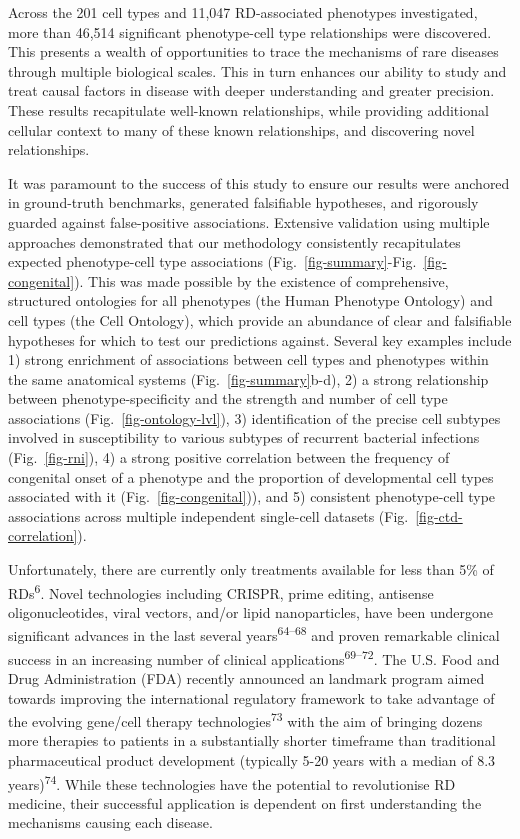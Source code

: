 \documentclass[
]{article}
\begin{document}
Across the 201 cell types and 11,047 RD-associated phenotypes
investigated, more than 46,514 significant phenotype-cell type
relationships were discovered. This presents a wealth of opportunities
to trace the mechanisms of rare diseases through multiple biological
scales. This in turn enhances our ability to study and treat causal
factors in disease with deeper understanding and greater precision.
These results recapitulate well-known relationships, while providing
additional cellular context to many of these known relationships, and
discovering novel relationships.

It was paramount to the success of this study to ensure our results were
anchored in ground-truth benchmarks, generated falsifiable hypotheses,
and rigorously guarded against false-positive associations. Extensive
validation using multiple approaches demonstrated that our methodology
consistently recapitulates expected phenotype-cell type associations
(Fig.~\ref{fig-summary}-Fig.~\ref{fig-congenital}). This was made
possible by the existence of comprehensive, structured ontologies for
all phenotypes (the Human Phenotype Ontology) and cell types (the Cell
Ontology), which provide an abundance of clear and falsifiable
hypotheses for which to test our predictions against. Several key
examples include 1) strong enrichment of associations between cell types
and phenotypes within the same anatomical systems
(Fig.~\ref{fig-summary}b-d), 2) a strong relationship between
phenotype-specificity and the strength and number of cell type
associations (Fig.~\ref{fig-ontology-lvl}), 3) identification of the
precise cell subtypes involved in susceptibility to various subtypes of
recurrent bacterial infections (Fig.~\ref{fig-rni}), 4) a strong
positive correlation between the frequency of congenital onset of a
phenotype and the proportion of developmental cell types associated with
it (Fig.~\ref{fig-congenital})), and 5) consistent phenotype-cell type
associations across multiple independent single-cell datasets
(Fig.~\ref{fig-ctd-correlation}).

Unfortunately, there are currently only treatments available for less
than 5\% of RDs\textsuperscript{6}. Novel technologies including CRISPR,
prime editing, antisense oligonucleotides, viral vectors, and/or lipid
nanoparticles, have been undergone significant advances in the last
several years\textsuperscript{64--68} and proven remarkable clinical
success in an increasing number of clinical
applications\textsuperscript{69--72}. The U.S. Food and Drug
Administration (FDA) recently announced an landmark program aimed
towards improving the international regulatory framework to take
advantage of the evolving gene/cell therapy
technologies\textsuperscript{73} with the aim of bringing dozens more
therapies to patients in a substantially shorter timeframe than
traditional pharmaceutical product development (typically 5-20 years
with a median of 8.3 years)\textsuperscript{74}. While these
technologies have the potential to revolutionise RD medicine, their
successful application is dependent on first understanding the
mechanisms causing each disease.
\end{document}
